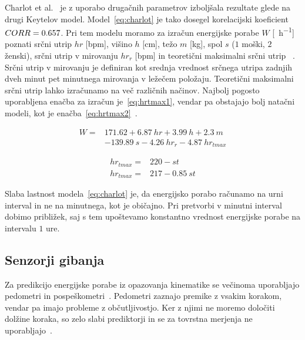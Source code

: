 Charlot et al.~\cite{charlot2014improvement} je z uporabo drugačnih parametrov izboljšala rezultate glede na drugi Keytelov model. Model~\eqref{eq:charlot} je tako dosegel korelacijski koeficient ${CORR}= \num{0.657}$. Pri tem modelu moramo za izračun energijske porabe $W$ [\si{\kcal\per\hour}]  poznati srčni utrip $hr$ [\si{bpm}], višino $h$ [\si{\cm}], težo $m$ [\si{\kg}], spol $s$ ($1$ moški, $2$ ženski), srčni utrip v mirovanju $hr_r$ [\si{bpm}] in teoretični maksimalni srčni utrip \hrtmax [\si{bpm}]~\cite{charlot2014improvement}. Srčni utrip v mirovanju je definiran kot srednja vrednost srčnega utripa zadnjih dveh minut pet minutnega mirovanja v ležečem položaju. Teoretični maksimalni srčni utrip lahko izračunamo na več različnih načinov. Najbolj pogosto uporabljena enačba za izračun je~\eqref{eq:hrtmax1}, vendar pa obstajajo bolj natačni modeli, kot je enačba~\eqref{eq:hrtmax2}~\cite{miller1993predicting}. 

\begin{align}\label{eq:charlot}
W = & \num{171.62} + \num{6.87}~hr + \num{3.99}~h + \num{2.3}~m \nonumber \\
& - \num{139.89}~s - \num{4.26}~hr_r - \num{4.87}~hr_{tmax}
\end{align}

\begin{align}
	hr_{tmax} = & \num{220} - st \label{eq:hrtmax1}\\ 
    hr_{tmax} = & 217 - \num{0.85}~st \label{eq:hrtmax2}
\end{align}

Slaba lastnost modela~\eqref{eq:charlot} je, da energijsko porabo računamo na urni interval in ne na minutnega, kot je običajno. Pri pretvorbi v minutni interval dobimo približek, saj s tem upoštevamo konstantno vrednost energijske porabe na intervalu $1$ ure. 





\subsection{Senzorji gibanja}\label{sec:senzorji-gibanja}

Za predikcijo energijske porabe iz opazovanja kinematike se večinoma uporabljajo pedometri in pospeškometri~\cite{levine2005measurement}. Pedometri zaznajo premike z vsakim korakom, vendar pa imajo probleme z občutljivostjo. Ker z njimi ne moremo določiti dolžine koraka, so zelo slabi prediktorji in se za tovrstna merjenja ne uporabljajo~\cite{levine2005measurement}.

